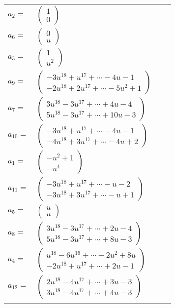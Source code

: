 \documentclass[1p]{elsarticle_modified}
\theoremstyle{definition}
\begin{document}
\begin{tabular}{m{7pt} m{180pt} m{7pt} m{180pt} }
\flushright $a_{2}=$&$\begin{pmatrix}1\\0\end{pmatrix}$ \\
\flushright $a_{6}=$&$\begin{pmatrix}0\\u\end{pmatrix}$ \\
\flushright $a_{3}=$&$\begin{pmatrix}1\\u^2\end{pmatrix}$ \\
\flushright $a_{9}=$&$\begin{pmatrix}-3 u^{18}+u^{17}+\cdots-4 u-1\\-2 u^{18}+2 u^{17}+\cdots-5 u^2+1\end{pmatrix}$ \\
\flushright $a_{7}=$&$\begin{pmatrix}3 u^{18}-3 u^{17}+\cdots+4 u-4\\5 u^{18}-3 u^{17}+\cdots+10 u-3\end{pmatrix}$ \\
\flushright $a_{10}=$&$\begin{pmatrix}-3 u^{18}+u^{17}+\cdots-4 u-1\\-4 u^{18}+3 u^{17}+\cdots-4 u+2\end{pmatrix}$ \\
\flushright $a_{1}=$&$\begin{pmatrix}- u^2+1\\- u^4\end{pmatrix}$ \\
\flushright $a_{11}=$&$\begin{pmatrix}-3 u^{18}+u^{17}+\cdots- u-2\\-3 u^{18}+3 u^{17}+\cdots- u+1\end{pmatrix}$ \\
\flushright $a_{5}=$&$\begin{pmatrix}u\\u\end{pmatrix}$ \\
\flushright $a_{8}=$&$\begin{pmatrix}3 u^{18}-3 u^{17}+\cdots+2 u-4\\5 u^{18}-3 u^{17}+\cdots+8 u-3\end{pmatrix}$ \\
\flushright $a_{4}=$&$\begin{pmatrix}u^{18}-6 u^{16}+\cdots-2 u^2+8 u\\-2 u^{18}+u^{17}+\cdots+2 u-1\end{pmatrix}$ \\
\flushright $a_{12}=$&$\begin{pmatrix}2 u^{18}-4 u^{17}+\cdots+3 u-3\\3 u^{18}-4 u^{17}+\cdots+4 u-3\end{pmatrix}$\\&\end{tabular}
\end{document}
